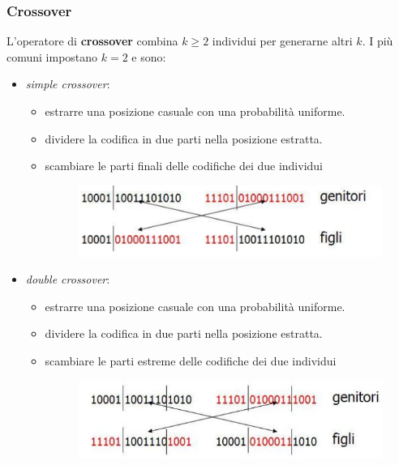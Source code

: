 \documentclass{article}
\begin{document}
\subsubsection{Crossover}
L'operatore di \textbf{crossover} combina $k\geq 2$ individui per generarne altri $k$.
I più comuni impostano $k=2$ e sono:
\begin{itemize}
    \item \textit{simple crossover}:
    \begin{itemize}
        \item estrarre una posizione casuale con una probabilità uniforme.
        \item dividere la codifica in due parti nella posizione estratta.
        \item scambiare le parti finali delle codifiche dei due individui
        \begin{figure}[H]
            \centering
            \includegraphics[scale=0.5]{images/crossover_1.png}
        \end{figure}
    \end{itemize}
    \item \textit{double crossover}:
    \begin{itemize}
        \item estrarre una posizione casuale con una probabilità uniforme.
        \item dividere la codifica in due parti nella posizione estratta.
        \item scambiare le parti estreme delle codifiche dei due individui
        \begin{figure}[H]
            \centering
            \includegraphics[scale=0.5]{images/crossover_2.png}
        \end{figure}
    \end{itemize}
\end{itemize}
\end{document}
